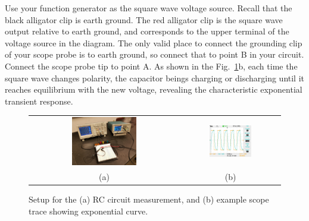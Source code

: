  Use your function generator as the square wave
voltage source.  Recall that the black alligator clip is earth ground.
The red alligator clip is the square wave output relative to earth
ground, and corresponds to the upper terminal of the voltage source in
the diagram.  The only valid place to connect the grounding clip of
your scope probe is to earth ground, so connect that to point B in
your circuit.  Connect the scope probe tip to point A.  As shown in
the Fig.~\ref{fig:rc_setup}b, each time the square wave changes
polarity, the capacitor beings charging or discharging until it
reaches equilibrium with the new voltage, revealing the characteristic
exponential transient response.

\begin{figure}[htbp]
\begin{center}
\begin{tabular}{cc}
\includegraphics[width=0.45\textwidth]{figs/labs/transients/rc_setup.jpg} &
\includegraphics[width=0.45\textwidth]{figs/labs/transients/rc_trace.jpg} \\
(a) & (b) \\
\end{tabular}
\caption{Setup for the (a) RC circuit measurement, and (b) example scope trace showing exponential curve.}
\label{fig:rc_setup}
\end{center}
\end{figure}

